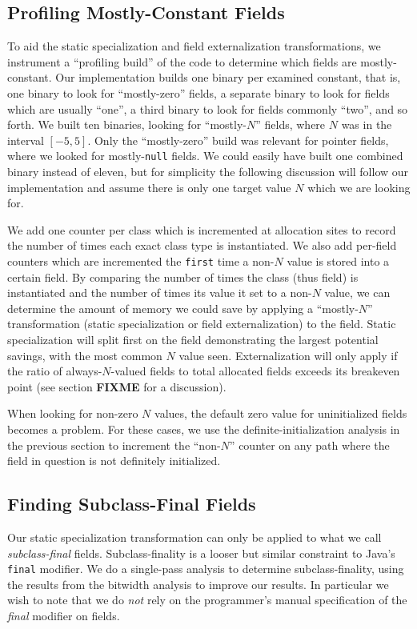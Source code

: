 \documentclass{acmconf}
\begin{document}
\subsection{Profiling Mostly-Constant Fields}
To aid the static specialization and field externalization
transformations, we instrument a ``profiling build'' of the code
to determine which fields are mostly-constant.  Our implementation
builds one binary per examined constant, that is, one binary to look
for ``mostly-zero'' fields, a separate binary to look for fields which
are usually ``one'', a third binary to look for fields commonly
``two'', and so forth.  We built ten binaries, looking for
``mostly-$N$'' fields, where $N$ was in the interval $[-5,5]$.
Only the ``mostly-zero'' build was relevant for pointer fields, where
we looked for mostly-{\tt null} fields.  We could easily have built
one combined binary instead of eleven, but for simplicity the following
discussion will follow our implementation and assume there is only one
target value $N$ which we are looking for.

We add one counter per class which is incremented at allocation sites
to record the number of times each exact class type is instantiated.
We also add per-field counters which are incremented the {\tt first}
time a non-$N$ value is stored into a certain field.  By comparing the
number of times the class (thus field) is instantiated and the number
of times its value it set to a non-$N$ value, we can determine the
amount of memory we could save by applying a ``mostly-$N$''
transformation (static specialization or field externalization) to the
field.  Static specialization will split first on the field
demonstrating the largest potential savings, with the most common $N$
value seen.  Externalization will only apply if the ratio of
always-$N$-valued fields to total allocated fields exceeds its
breakeven point (see section {\bf\Large FIXME} for a discussion).

When looking for non-zero $N$ values, the default zero value for
uninitialized fields becomes a problem.  For these cases, we use the
definite-initialization analysis in the previous section to increment the
``non-$N$'' counter on any path where the field in question is not
definitely initialized.

\subsection{Finding Subclass-Final Fields}
\label{sec:subclass-final}
Our static specialization transformation can only be applied to what
we call {\it subclass-final} fields.  Subclass-finality is a looser
but similar constraint to Java's {\tt final} modifier.  We do a
single-pass analysis to determine subclass-finality, using the results
from the bitwidth analysis to improve our results.  In particular we
wish to note that we do {\it not} rely on the programmer's manual
specification of the {\it final} modifier on fields.
\end{document}
